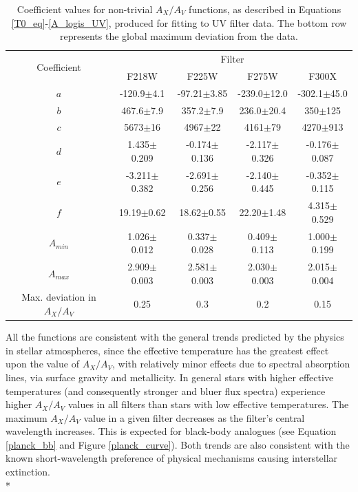 \documentclass[12pt, a4paper]{report}
\begin{document}
\begin{table}
\begin{center}
\begin{tabular}{ccccc}
\hline
\multirow{2}{*}{Coefficient} & \multicolumn{4}{c}{Filter} \\
 & F218W & F225W & F275W & F300X \\
\hline
$a$ & -120.9$\pm$4.1 & -97.21$\pm$3.85 & -239.0$\pm$12.0 & -302.1$\pm$45.0 \\
$b$ & 467.6$\pm$7.9 & 357.2$\pm$7.9 & 236.0$\pm$20.4 & 350$\pm$125 \\
$c$ & 5673$\pm$16 & 4967$\pm$22 & 4161$\pm$79 & 4270$\pm$913 \\
$d$ & 1.435$\pm$0.209 & -0.174$\pm$0.136 & -2.117$\pm$0.326 & -0.176$\pm$0.087 \\
$e$ & -3.211$\pm$0.382 & -2.691$\pm$0.256  & -2.140$\pm$0.445 & -0.352$\pm$0.115 \\
$f$ & 19.19$\pm$0.62 & 18.62$\pm$0.55  & 22.20$\pm$1.48 & 4.315$\pm$0.529 \\
$A_{min}$ & 1.026$\pm$0.012 & 0.337$\pm$0.028 & 0.409$\pm$0.113 & 1.000$\pm$0.199 \\
$A_{max}$ & 2.909$\pm$0.003 & 2.581$\pm$0.003 & 2.030$\pm$0.003 & 2.015$\pm$0.004 \\
\hline
Max. deviation in $A_{X}/A_{V}$ & 0.25 & 0.3 & 0.2 & 0.15 \\
\hline
\end{tabular}
\caption{Coefficient values for non-trivial $A_{X}/A_{V}$ functions, as described in Equations \ref{T0_eq}-\ref{A_logis_UV}, produced for fitting to UV filter data. The bottom row represents the global maximum deviation from the data.}
\label{UV_coeffs_table}
\end{center}
\end{table}

All the functions are consistent with the general trends predicted by the physics in stellar atmospheres, since the effective temperature has the greatest effect upon the value of $A_{X}/A_{V}$, with relatively minor effects due to spectral absorption lines, via surface gravity and metallicity. In general stars with higher effective temperatures (and consequently stronger and bluer flux spectra) experience higher $A_{X}/A_{V}$ values in all filters than stars with low effective temperatures. The maximum $A_{X}/A_{V}$ value in a given filter decreases as the filter's central wavelength increases. This is expected for black-body analogues (see Equation \ref{planck_bb} and Figure \ref{planck_curve}). Both trends are also consistent with the known short-wavelength preference of physical mechanisms causing interstellar extinction.\\*
\end{document}
